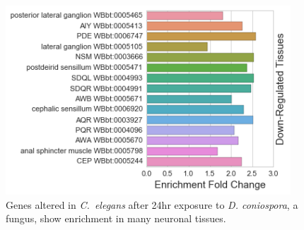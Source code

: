 \documentclass{bmcart}
\begin{document}
\begin{backmatter}
\begin{figure}[h!]
    \includegraphics[width=0.95\textwidth]{figures/DrechmeriaconiosporaEnrichment.png}
	\captionsetup{width= 0.95\textwidth}
  	\caption{
      Genes altered in   \emph{C.~elegans} after 24hr exposure to \emph{D. coniospora}, a fungus, show enrichment
	  in many neuronal tissues.}
	\label{fig:Dcon}
\end{figure}



\end{backmatter}
\end{document}
